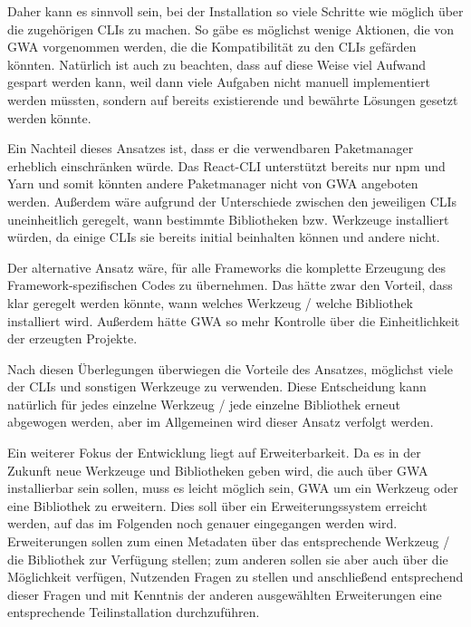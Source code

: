 \label{decision_use_clis}
Daher kann es sinnvoll sein, bei der Installation so viele Schritte wie möglich über die zugehörigen \gls{CLI}s zu machen. So gäbe es möglichst wenige Aktionen, die von \gls{GWA} vorgenommen werden, die die Kompatibilität zu den \gls{CLI}s gefärden könnten. Natürlich ist auch zu beachten, dass auf diese Weise viel Aufwand gespart werden kann, weil dann viele Aufgaben nicht manuell implementiert werden müssten, sondern auf bereits existierende und bewährte Lösungen gesetzt werden könnte.

Ein Nachteil dieses Ansatzes ist, dass er die verwendbaren Paketmanager erheblich einschränken würde. Das React-\gls{CLI} unterstützt bereits nur \gls{npm} und Yarn \cite{cra_package_managers} und somit könnten andere Paketmanager nicht von \gls{GWA} angeboten werden. Außerdem wäre aufgrund der Unterschiede zwischen den jeweiligen \gls{CLI}s uneinheitlich geregelt, wann bestimmte Bibliotheken bzw. Werkzeuge installiert würden, da einige \gls{CLI}s sie bereits initial beinhalten können und andere nicht.

Der alternative Ansatz wäre, für alle Frameworks die komplette Erzeugung des Framework-spezifischen Codes zu übernehmen. Das hätte zwar den Vorteil, dass klar geregelt werden könnte, wann welches Werkzeug / welche Bibliothek installiert wird. Außerdem hätte \gls{GWA} so mehr Kontrolle über die Einheitlichkeit der erzeugten Projekte.

Nach diesen Überlegungen überwiegen die Vorteile des Ansatzes, möglichst viele der \gls{CLI}s und sonstigen Werkzeuge zu verwenden. Diese Entscheidung kann natürlich für jedes einzelne Werkzeug / jede einzelne Bibliothek erneut abgewogen werden, aber im Allgemeinen wird dieser Ansatz verfolgt werden.

Ein weiterer Fokus der Entwicklung liegt auf Erweiterbarkeit. Da es in der Zukunft neue Werkzeuge und Bibliotheken geben wird, die auch über \gls{GWA} installierbar sein sollen, muss es leicht möglich sein, \gls{GWA} um ein Werkzeug oder eine Bibliothek zu erweitern. Dies soll über ein Erweiterungssystem erreicht werden, auf das im Folgenden noch genauer eingegangen werden wird. Erweiterungen sollen zum einen Metadaten über das entsprechende Werkzeug / die Bibliothek zur Verfügung stellen; zum anderen sollen sie aber auch über die Möglichkeit verfügen, Nutzenden Fragen zu stellen und anschließend entsprechend dieser Fragen und mit Kenntnis der anderen ausgewählten Erweiterungen eine entsprechende Teilinstallation durchzuführen.

